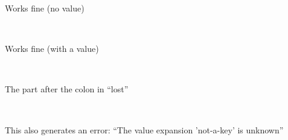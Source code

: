 \documentclass{article}
\begin{document}
Works fine (no value)\par
{}

~

Works fine (with a value)\par
{}


~


The part after the colon in ``lost''\par
{}


~

This also generates an error: ``The value expansion 'not-a-key' is unknown''\par
{}
\end{document}
